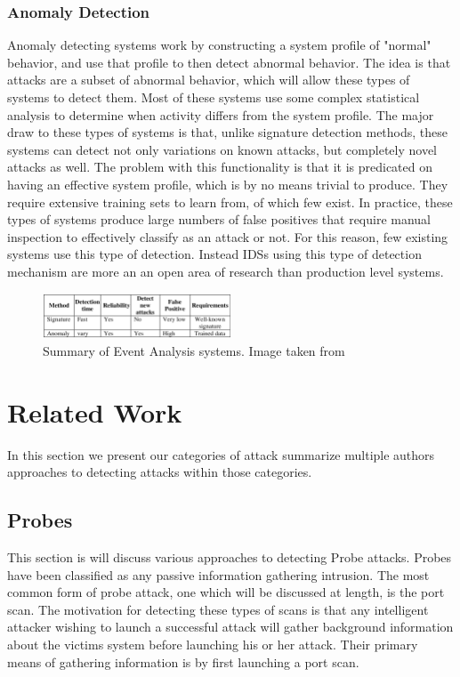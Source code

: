 \documentclass{acm_proc_article-sp}
\begin{document}
    	\subsubsection{Anomaly Detection}
    		Anomaly detecting systems work by constructing a system profile of "normal" behavior, and use that profile to then detect abnormal behavior. The idea is that attacks are a subset of abnormal behavior, which will allow these types of systems to detect them. Most of these systems use some complex statistical analysis to determine when activity differs from the system profile. The major draw to these types of systems is that, unlike signature detection methods, these systems can detect not only variations on known attacks, but completely novel attacks as well. The problem with this functionality is that it is predicated on having an effective system profile, which is by no means trivial to produce. They require extensive training sets to learn from, of which few exist. In practice, these types of systems produce large numbers of false positives that require manual inspection to effectively classify as an attack or not. For this reason, few existing systems use this type of detection. Instead IDSs using this type of detection mechanism are more an an open area of research than production level systems. 
    	\begin{figure}[h!]
			\centering
			\includegraphics[width=0.5\textwidth]{signatreVSanomaly.png}
			\caption{Summary of Event Analysis systems. Image taken from \cite{Alenezi2012}}
			\label{comparison}
	\end{figure}
\section{Related Work}
    In this section we present our categories of attack summarize multiple authors approaches to detecting attacks within those categories.
    
    \subsection{Probes}
	 This section is will discuss various approaches to detecting Probe attacks. Probes have been classified as any passive information gathering intrusion. The most common form of probe attack, one which will be discussed at length, is the port scan. The motivation for detecting these types of scans is that any intelligent attacker wishing to launch a successful attack will gather background information about the victims system before launching his or her attack. Their primary means of gathering information is by first launching a port scan.
	 
\end{document}
